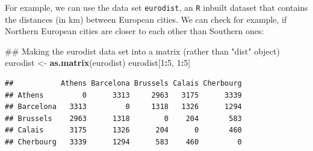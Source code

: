 \documentclass[]{book}
\newenvironment{Shaded}{\begin{snugshade}}{\end{snugshade}}
\newcommand{\KeywordTok}[1]{\textcolor[rgb]{0.13,0.29,0.53}{\textbf{#1}}}
\newcommand{\DecValTok}[1]{\textcolor[rgb]{0.00,0.00,0.81}{#1}}
\newcommand{\StringTok}[1]{\textcolor[rgb]{0.31,0.60,0.02}{#1}}
\newcommand{\OperatorTok}[1]{\textcolor[rgb]{0.81,0.36,0.00}{\textbf{#1}}}
\newcommand{\NormalTok}[1]{#1}
\theoremstyle{definition}
\theoremstyle{definition}
\theoremstyle{remark}
\begin{document}
For example, we can use the data set \texttt{eurodist}, an \texttt{R}
inbuilt dataset that contains the distances (in km) between European
cities. We can check for example, if Northern European cities are closer
to each other than Southern ones:

\begin{Shaded}
\begin{Highlighting}[]
\NormalTok{## Making the eurodist data set into a matrix (rather than "dist" object)}
\NormalTok{eurodist <-}\StringTok{ }\KeywordTok{as.matrix}\NormalTok{(eurodist)}
\NormalTok{eurodist[}\DecValTok{1}\OperatorTok{:}\DecValTok{5}\NormalTok{, }\DecValTok{1}\OperatorTok{:}\DecValTok{5}\NormalTok{]}
\end{Highlighting}
\end{Shaded}

\begin{verbatim}
##           Athens Barcelona Brussels Calais Cherbourg
## Athens         0      3313     2963   3175      3339
## Barcelona   3313         0     1318   1326      1294
## Brussels    2963      1318        0    204       583
## Calais      3175      1326      204      0       460
## Cherbourg   3339      1294      583    460         0
\end{verbatim}
\end{document}
